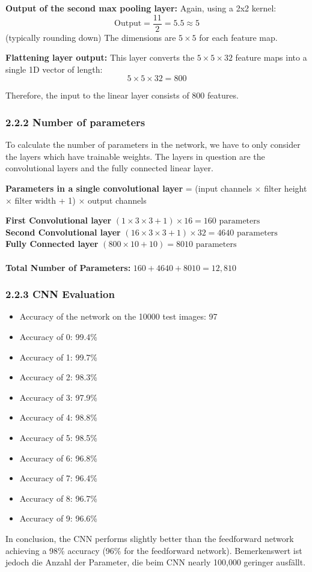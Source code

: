 \textbf{Output of the second max pooling layer:} 
Again, using a 2x2 kernel:
\[ \text{Output} = \frac{11}{2} = 5.5 \approx 5 \] (typically rounding down)
The dimensions are \(5 \times 5\) for each feature map.

\textbf{Flattening layer output:} 
This layer converts the \(5 \times 5 \times 32\) feature maps into a single 1D vector of length:
\[ 5 \times 5 \times 32 = 800 \]

Therefore, the input to the linear layer consists of 800 features.

\subsubsection*{2.2.2 Number of parameters}
To calculate the number of parameters in the network, we have to only consider the layers which have trainable weights. The layers in question are the convolutional layers and the fully connected linear layer. 


\textbf{Parameters in a single convolutional layer} = (input channels $\times$ filter height $\times$ filter width + 1) $\times$ output channels

\textbf{First Convolutional layer } \((1 \times 3 \times 3 + 1) \times 16 = 160 \text{ parameters}\)
\newline
\\
\textbf{Second Convolutional layer } \((16 \times 3 \times 3 + 1) \times 32 = 4640 \text{ parameters}\)
\newline
\\
\textbf{Fully Connected layer} \((800 \times 10 + 10) = 8010 \text{ parameters}\)
\\
\\
\textbf{Total Number of Parameters:} \(160 + 4640 + 8010 = 12,810\)


\subsubsection*{2.2.3 CNN Evaluation}

\begin{itemize}
\item Accuracy of the network on the 10000 test images: 97 %
\item Accuracy of 0: 99.4\%
\item Accuracy of 1: 99.7\%
\item Accuracy of 2: 98.3\%
\item Accuracy of 3: 97.9\%
\item Accuracy of 4: 98.8\%
\item Accuracy of 5: 98.5\%
\item Accuracy of 6: 96.8\%
\item Accuracy of 7: 96.4\%
\item Accuracy of 8: 96.7\%
\item Accuracy of 9: 96.6\%
\end{itemize}

In conclusion, the CNN performs slightly better than the feedforward network achieving a 98\% accuracy (96\% for the feedforward network). Bemerkenswert ist jedoch die Anzahl der Parameter, die beim CNN nearly 100,000 geringer ausfällt. 

\normalsize
